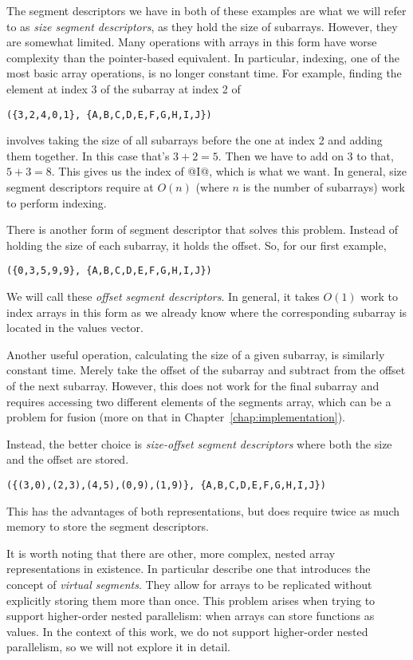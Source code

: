 The segment descriptors we have in both of these examples are what we will refer to as \emph{size segment descriptors}, as they hold the size of subarrays. However, they are somewhat limited. Many operations with arrays in this form have worse complexity than the pointer-based equivalent. In particular, indexing, one of the most basic array operations, is no longer constant time. For example, finding the element at index 3 of the subarray at index 2 of
%
\begin{lstlisting}
({3,2,4,0,1}, {A,B,C,D,E,F,G,H,I,J})
\end{lstlisting}
%
involves taking the size of all subarrays before the one at index 2 and adding them together. In this case that's $3+2=5$. Then we have to add on 3 to that, $5+3=8$. This gives us the index of @I@, which is what we want. In general, size segment descriptors require at $O(n)$ (where $n$ is the number of subarrays) work to perform indexing.

There is another form of segment descriptor that solves this problem. Instead of holding the size of each subarray, it holds the offset. So, for our first example,
%
\begin{lstlisting}
({0,3,5,9,9}, {A,B,C,D,E,F,G,H,I,J})
\end{lstlisting}
%
We will call these \emph{offset segment descriptors}. In general, it takes $O(1)$ work to index arrays in this form as we already know where the corresponding subarray is located in the values vector.

Another useful operation, calculating the size of a given subarray, is similarly constant time. Merely take the offset of the subarray and subtract from the offset of the next subarray. However, this does not work for the final subarray and requires accessing two different elements of the segments array, which can be a problem for fusion (more on that in Chapter~\ref{chap:implementation}).

Instead, the better choice is \emph{size-offset segment descriptors} where both the size and the offset are stored.
%
\begin{lstlisting}
({(3,0),(2,3),(4,5),(0,9),(1,9)}, {A,B,C,D,E,F,G,H,I,J})
\end{lstlisting}
%
This has the advantages of both representations, but does require twice as much memory to store the segment descriptors.


It is worth noting that there are other, more complex, nested array representations in existence. In particular \citet{Lippmeier:replicate} describe one that introduces the concept of \emph{virtual segments}. They allow for arrays to be replicated without explicitly storing them more than once. This problem arises when trying to support higher-order nested parallelism: when arrays can store functions as values. In the context of this work, we do not support higher-order nested parallelism, so we will not explore it in detail.

